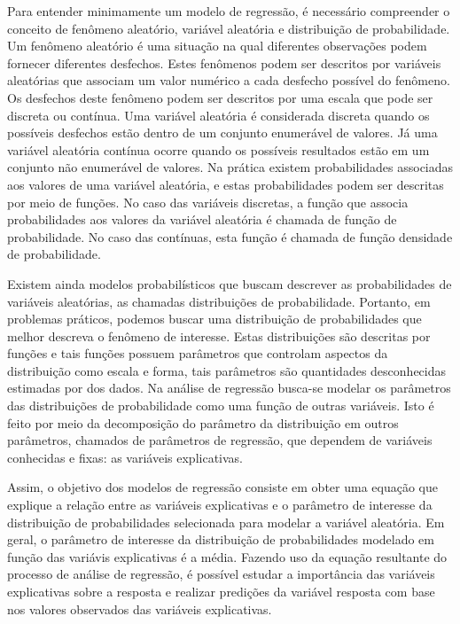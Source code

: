 Para entender minimamente um modelo de regressão, é necessário compreender o conceito de fenômeno aleatório, variável aleatória e distribuição de probabilidade. Um fenômeno aleatório é uma situação na qual diferentes observações podem fornecer diferentes desfechos. Estes fenômenos podem ser descritos por variáveis aleatórias que associam um valor numérico a cada desfecho possível do fenômeno. Os desfechos deste fenômeno podem ser descritos por uma escala que pode ser discreta ou contínua. Uma variável aleatória é considerada discreta quando os possíveis desfechos estão dentro de um conjunto enumerável de valores. Já uma variável aleatória contínua ocorre quando os possíveis resultados estão em um conjunto não enumerável de valores. Na prática existem probabilidades associadas aos valores de uma variável aleatória, e estas probabilidades podem ser descritas por meio de funções. No caso das variáveis discretas, a função que associa probabilidades aos valores da variável aleatória é chamada de função de probabilidade. No caso das contínuas, esta função é chamada de função densidade de probabilidade.

Existem ainda modelos probabilísticos que buscam descrever as probabilidades de variáveis aleatórias, as chamadas distribuições de probabilidade. Portanto, em problemas práticos, podemos buscar uma distribuição de probabilidades que melhor descreva o fenômeno de interesse. Estas distribuições são descritas por funções e tais funções possuem parâmetros que controlam aspectos da distribuição como escala e forma, tais parâmetros são quantidades desconhecidas estimadas por dos dados. Na análise de regressão busca-se modelar os parâmetros das distribuições de probabilidade como uma função de outras variáveis. Isto é feito por meio da decomposição do parâmetro da distribuição em outros parâmetros, chamados de parâmetros de regressão, que dependem de variáveis conhecidas e fixas: as variáveis explicativas. 

Assim, o objetivo dos modelos de regressão consiste em obter uma equação que explique a relação entre as variáveis explicativas e o parâmetro de interesse da distribuição de probabilidades selecionada para modelar a variável aleatória. Em geral, o parâmetro de interesse da distribuição de probabilidades modelado em função das variávis explicativas é a média. Fazendo uso da equação resultante do processo de análise de regressão, é possível estudar a importância das variáveis explicativas sobre a resposta e realizar predições da variável resposta com base nos valores observados das variáveis explicativas. 

